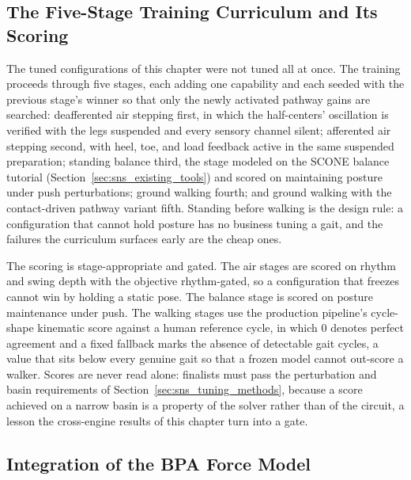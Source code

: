\subsection{The Five-Stage Training Curriculum and Its Scoring}\label{sec:sns_curriculum}

The tuned configurations of this chapter were not tuned all at once. The training proceeds through five stages, each adding one capability and each seeded with the previous stage's winner so that only the newly activated pathway gains are searched: deafferented air stepping first, in which the half-centers' oscillation is verified with the legs suspended and every sensory channel silent; afferented air stepping second, with heel, toe, and load feedback active in the same suspended preparation; standing balance third, the stage modeled on the SCONE balance tutorial (Section~\ref{sec:sns_existing_tools}) and scored on maintaining posture under push perturbations; ground walking fourth; and ground walking with the contact-driven pathway variant fifth. Standing before walking is the design rule: a configuration that cannot hold posture has no business tuning a gait, and the failures the curriculum surfaces early are the cheap ones.

The scoring is stage-appropriate and gated. The air stages are scored on rhythm and swing depth with the objective rhythm-gated, so a configuration that freezes cannot win by holding a static pose. The balance stage is scored on posture maintenance under push. The walking stages use the production pipeline's cycle-shape kinematic score against a human reference cycle, in which 0 denotes perfect agreement and a fixed fallback marks the absence of detectable gait cycles, a value that sits below every genuine gait so that a frozen model cannot out-score a walker. Scores are never read alone: finalists must pass the perturbation and basin requirements of Section~\ref{sec:sns_tuning_methods}, because a score achieved on a narrow basin is a property of the solver rather than of the circuit, a lesson the cross-engine results of this chapter turn into a gate.

\subsection{Integration of the BPA Force Model}\label{sec:sns_bpa_integration}


